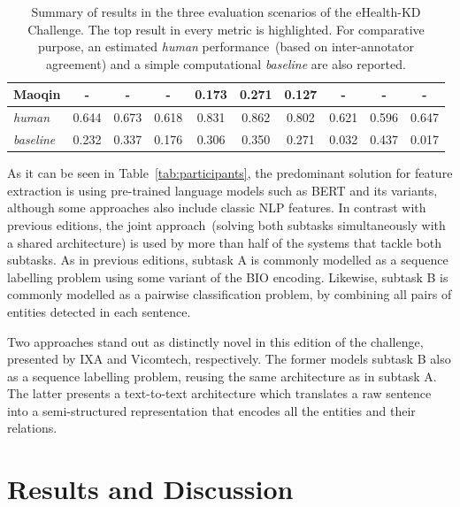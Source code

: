 \documentclass[a4paper,11pt,twocolumn,twoside]{article}
\begin{document}
\begin{table}[htb]
{\begin{tabular}{l|ccc|ccc|ccc}
      Maoqin           & -                                  & -                                    & -                                   & 0.173     & 0.271     & 0.127     & -         & -         & -         \\
      \midrule
      \it human        & 0.644                              & 0.673                                & 0.618                               & 0.831     & 0.862     & 0.802     & 0.621     & 0.596     & 0.647     \\
      \it baseline     & 0.232                              & 0.337                                & 0.176                               & 0.306     & 0.350     & 0.271     & 0.032     & 0.437     & 0.017     \\
      \bottomrule
    \end{tabular}}
  \caption{Summary of results in the three evaluation scenarios of the eHealth-KD Challenge. The top result in every metric is highlighted. For comparative purpose, an estimated \textit{human} performance~(based on inter-annotator agreement) and a simple computational \textit{baseline} are also reported.\label{tab:results}}
\end{table}

As it can be seen in Table~\ref{tab:participants}, the predominant solution for feature extraction is using pre-trained language models such as BERT and its variants, although some approaches also include classic NLP features.
In contrast with previous editions, the joint approach~(solving both subtasks simultaneously with a shared architecture) is used by more than half of the systems that tackle both subtasks.
As in previous editions, subtask A is commonly modelled as a sequence labelling problem using some variant of the BIO encoding.
Likewise, subtask B is commonly modelled as a pairwise classification problem, by combining all pairs of entities detected in each sentence.

Two approaches stand out as distinctly novel in this edition of the challenge, presented by IXA and Vicomtech, respectively.
The former models subtask B also as a sequence labelling problem, reusing the same architecture as in subtask A.
The latter presents a text-to-text architecture which translates a raw sentence into a semi-structured representation that encodes all the entities and their relations.

\section{Results and Discussion}\label{sec:results}
\end{document}
